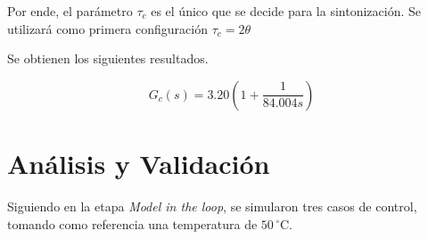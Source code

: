 \documentclass[journal]{IEEEtran}
\begin{document}
Por ende, el parámetro $\tau_c$ es el único que se decide para la sintonización. Se utilizará como primera configuración $\tau_c=2\theta$

Se obtienen los siguientes resultados.

\begin{table}[H]
    \centering
    \caption{Modelo nominal y parámetros del controlador PI-SIMC}
    \label{tab:parametros_controlador}
    
\end{table}

\begin{equation}
        G_{c}(s)=3.20\left(1+\frac{1}{84.004 s}\right)
\end{equation}

\section{Análisis y Validación}

Siguiendo en la etapa \textit{Model in the loop}, se simularon tres casos de control, tomando como referencia una temperatura de $50\,^\circ\mathrm{C}$.
\end{document}
